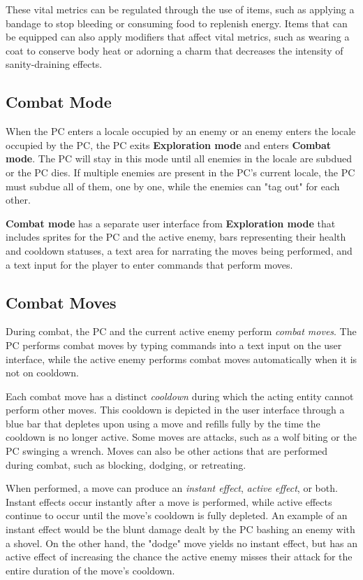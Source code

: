 \documentclass[11pt]{article}
\begin{document}
	These vital metrics can be regulated through the use of items, such as applying a bandage to stop bleeding or consuming food to replenish energy. Items that can be equipped can also apply modifiers that affect vital metrics, such as wearing a coat to conserve body heat or adorning a charm that decreases the intensity of sanity-draining effects.
	
	\subsection{Combat Mode}
	
	When the PC enters a locale occupied by an enemy or an enemy enters the locale occupied by the PC, the PC exits \textbf{Exploration mode} and enters \textbf{Combat mode}. The PC will stay in this mode until all enemies in the locale are subdued or the PC dies. If multiple enemies are present in the PC's current locale, the PC must subdue all of them, one by one, while the enemies can "tag out" for each other.
	
	\textbf{Combat mode} has a separate user interface from \textbf{Exploration mode} that includes sprites for the PC and the active enemy, bars representing their health and cooldown statuses, a text area for narrating the moves being performed, and a text input for the player to enter commands that perform moves.
	
	\subsection{Combat Moves}
	During combat, the PC and the current active enemy perform \textit{combat moves}. The PC performs combat moves by typing commands into a text input on the user interface, while the active enemy performs combat moves automatically when it is not on cooldown.
	
	Each combat move has a distinct \textit{cooldown} during which the acting entity cannot perform other moves. This cooldown is depicted in the user interface through a blue bar that depletes upon using a move and refills fully by the time the cooldown is no longer active. Some moves are attacks, such as a wolf biting or the PC swinging a wrench. Moves can also be other actions that are performed during combat, such as blocking, dodging, or retreating.
	
	When performed, a move can produce an \textit{instant effect}, \textit{active effect}, or both. Instant effects occur instantly after a move is performed, while active effects continue to occur until the move's cooldown is fully depleted. An example of an instant effect would be the blunt damage dealt by the PC bashing an enemy with a shovel. On the other hand, the "dodge" move yields no instant effect, but has an active effect of increasing the chance the active enemy misses their attack for the entire duration of the move's cooldown.
	
\end{document}
